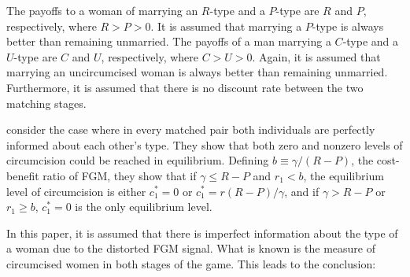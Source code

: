 \documentclass[12pt]{article}
\begin{document}
The payoffs to a woman of marrying an $R$-type and a $P$-type are $R$ and $P$, respectively, where $R > P > 0$. It is assumed that marrying a $P$-type is always better than remaining unmarried. The payoffs of a man marrying a $C$-type and a $U$-type are $C$ and $U$, respectively, where $C > U > 0$. Again, it is assumed that marrying an uncircumcised woman is always better than remaining unmarried. Furthermore, it is assumed that there is no discount rate between the two matching stages.

\citet{Chesnokova2007} consider the case where in every matched pair both individuals are perfectly informed about each other's type.  They show that both zero and nonzero levels of circumcision could be reached in equilibrium.  Defining $b \equiv \gamma/(R - P)$, the cost-benefit ratio of FGM, they show that if $\gamma \leq R - P$ and $r_1 < b$, the equilibrium level of circumcision is either $c_1^* = 0$ or $c_1^* = r(R-P)/\gamma$, and if $\gamma > R - P$ or $r_1 \geq b$, $c_1^* = 0$ is the only equilibrium level.

In this paper, it is assumed that there is imperfect information about the type of a woman due to the distorted FGM signal.  What is known is the measure of circumcised women in both stages of the game.  This leads to the conclusion:
\end{document}
